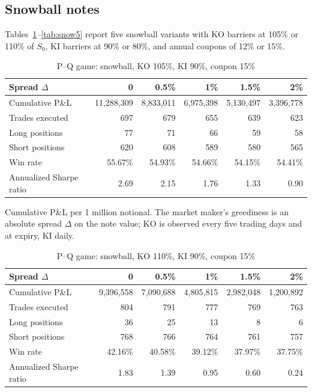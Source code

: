 \documentclass[12pt,letterpaper]{article}
\newcommand{\tabnote}[1]{\begin{minipage}{\linewidth}\vspace{4pt}\footnotesize\singlespacing #1\end{minipage}}
\begin{document}
\subsection{Snowball notes}

Tables~\ref{tab:snow1}--\ref{tab:snow5} report five snowball variants with
KO barriers at 105\% or 110\% of $S_0$, KI barriers at 90\% or 80\%, and
annual coupons of 12\% or 15\%.

\begin{table}[ht]
\singlespacing
\centering
\caption{P--Q game: snowball, KO 105\%, KI 90\%, coupon 15\%}
\label{tab:snow1}
\begin{tabular}{lrrrrr}
\toprule
Spread $\Delta$ & 0 & 0.5\% & 1\% & 1.5\% & 2\% \\
\midrule
Cumulative P\&L & 11{,}288{,}309 & 8{,}833{,}011 & 6{,}975{,}398 & 5{,}130{,}497 & 3{,}396{,}778 \\
Trades executed & 697 & 679 & 655 & 639 & 623 \\
Long positions  & 77 & 71 & 66 & 59 & 58 \\
Short positions & 620 & 608 & 589 & 580 & 565 \\
Win rate & 55.67\% & 54.93\% & 54.66\% & 54.15\% & 54.41\% \\
Annualized Sharpe ratio & 2.69 & 2.15 & 1.76 & 1.33 & 0.90 \\
\bottomrule
\end{tabular}
\tabnote{Cumulative P\&L per 1 million notional. The market maker's
greediness is an absolute spread $\Delta$ on the note value; KO is observed
every five trading days and at expiry, KI daily.}
\end{table}

\begin{table}[ht]
\singlespacing
\centering
\caption{P--Q game: snowball, KO 110\%, KI 90\%, coupon 15\%}
\label{tab:snow2}
\begin{tabular}{lrrrrr}
\toprule
Spread $\Delta$ & 0 & 0.5\% & 1\% & 1.5\% & 2\% \\
\midrule
Cumulative P\&L & 9{,}396{,}558 & 7{,}090{,}688 & 4{,}805{,}815 & 2{,}982{,}048 & 1{,}200{,}892 \\
Trades executed & 804 & 791 & 777 & 769 & 763 \\
Long positions  & 36 & 25 & 13 & 8 & 6 \\
Short positions & 768 & 766 & 764 & 761 & 757 \\
Win rate & 42.16\% & 40.58\% & 39.12\% & 37.97\% & 37.75\% \\
Annualized Sharpe ratio & 1.83 & 1.39 & 0.95 & 0.60 & 0.24 \\
\bottomrule
\end{tabular}
\end{table}
\end{document}
